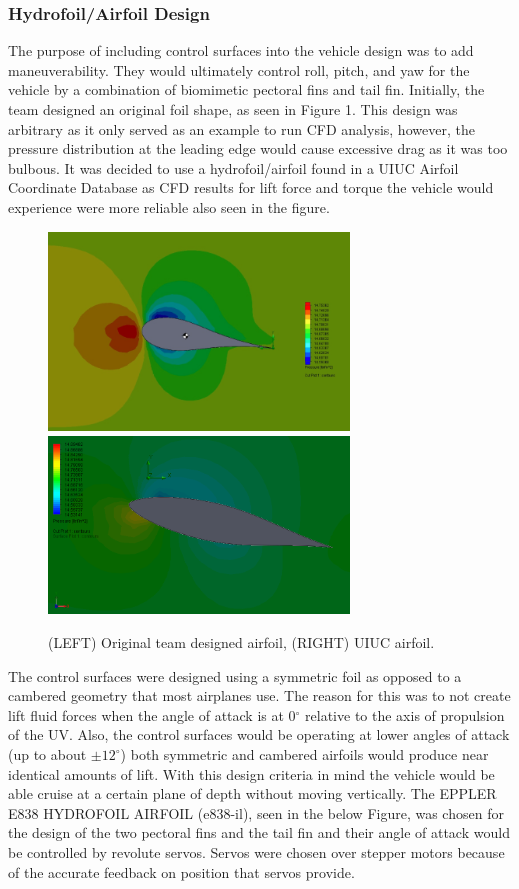 \documentclass{report}
\begin{document}
\subsubsection{Hydrofoil/Airfoil Design}
The purpose of including control surfaces into the vehicle design was to add maneuverability. They would ultimately control roll, pitch, and yaw for the vehicle by a combination of biomimetic pectoral fins and tail fin. Initially, the team designed an original foil shape, as seen in Figure 1. This design was arbitrary as it only served as an example to run CFD analysis, however, the pressure distribution at the leading edge would cause excessive drag as it was too bulbous.  It was decided to use a hydrofoil/airfoil found in a UIUC Airfoil Coordinate Database as CFD results for lift force and torque the vehicle would experience were more reliable also seen in the figure. 
\begin{figure}[H]
\centering
\includegraphics[width=8cm]{hfl}
\includegraphics[width=8cm]{hfr}
\caption{(LEFT) Original team designed airfoil, (RIGHT) UIUC airfoil.}
\end{figure}
The control surfaces were designed using a symmetric foil as opposed to a cambered geometry that most airplanes use. The reason for this was to not create lift fluid forces when the angle of attack is at 0$^\circ$ relative to the axis of propulsion of the UV.  Also, the control surfaces would be operating at lower angles of attack (up to about $\pm12^\circ$) both symmetric and cambered airfoils would produce near identical amounts of lift.  With this design criteria in mind the vehicle would be able cruise at a certain plane of depth without moving vertically. The EPPLER E838 HYDROFOIL AIRFOIL (e838-il), seen in the below Figure,  was chosen for the design of the two pectoral fins and the tail fin and their angle of attack would be controlled by revolute servos. Servos were chosen over stepper motors because of the accurate feedback on position that servos provide.
\end{document}
